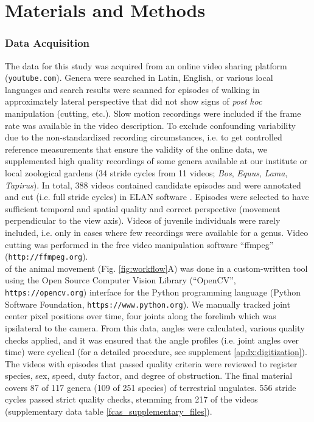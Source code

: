 \FloatBarrier\clearpage
\section{Materials and Methods}
\subsubsection{Data Acquisition}
The data for this study was acquired from an online video sharing platform (\nolinkurl{youtube.com}).
Genera were searched in Latin, English, or various local languages and search results were scanned for episodes of walking in approximately lateral perspective that did not show signs of \textit{post hoc} manipulation (cutting, etc.).
Slow motion recordings were included if the frame rate was available in the video description.
To exclude confounding variability due to the non-standardized recording circumstances, i.e. to get controlled reference measurements that ensure the validity of the online data, we supplemented high quality recordings of some genera available at our institute or local zoological gardens (34 stride cycles from 11 videos; \textit{Bos}, \textit{Equus}, \textit{Lama}, \textit{Tapirus}).
In total, 388 videos contained candidate episodes and were annotated and cut (i.e. full stride cycles) in ELAN software \citep[Max Planck Institute for Psycholinguistics, Nijmegen;][]{Brugman2004}.
Episodes were selected to have sufficient temporal and spatial quality and correct perspective (movement perpendicular to the view axis).
Videos of juvenile individuals were rarely included, i.e. only in cases where few recordings were available for a genus.
Video cutting was performed in the free video manipulation software ``ffmpeg'' (\nolinkurl{http://ffmpeg.org}).
\\ of the animal movement (Fig. \ref{fig:workflow}A) was done in a custom-written tool \citep{MMielke2020} using the Open Source Computer Vision Library (``OpenCV'', \nolinkurl{https://opencv.org}) interface for the Python programming language (Python Software Foundation, \nolinkurl{https://www.python.org}).
We manually tracked joint center pixel positions over time,  four joints along the forelimb which was ipsilateral to the camera.
From this data,  angles were calculated, various quality checks applied, and it was ensured that the  angle profiles (i.e. joint angles over time) were cyclical (for a detailed procedure, see supplement \ref*{apdx:digitization}).
The videos with episodes that passed quality criteria were reviewed to register species, sex, speed, duty factor, and degree of obstruction.
The final material covers 87 of 117 genera (109 of 251 species) of terrestrial ungulates.
556 stride cycles passed strict quality checks, stemming from 217 of the videos (supplementary data table \ref{fcas_supplementary_files}).


